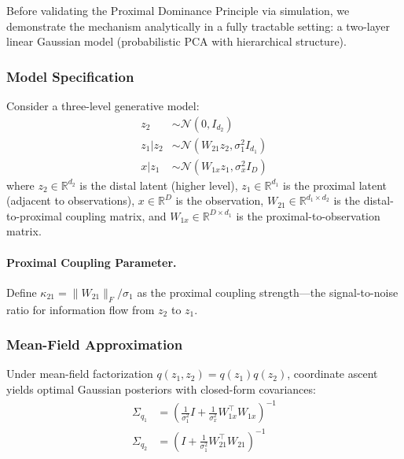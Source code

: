 \documentclass[10pt]{article} %
\theoremstyle{plain}
\theoremstyle{definition}
\begin{document}
Before validating the Proximal Dominance Principle via simulation, we demonstrate the mechanism analytically in a fully tractable setting: a two-layer linear Gaussian model (probabilistic PCA with hierarchical structure).

\subsubsection{Model Specification}

Consider a three-level generative model:
\begin{align}
z_2 &\sim \mathcal{N}(0, I_{d_2}) \\
z_1 | z_2 &\sim \mathcal{N}(W_{21} z_2, \sigma_1^2 I_{d_1}) \\
x | z_1 &\sim \mathcal{N}(W_{1x} z_1, \sigma_x^2 I_D)
\end{align}
where $z_2 \in \mathbb{R}^{d_2}$ is the distal latent (higher level), $z_1 \in \mathbb{R}^{d_1}$ is the proximal latent (adjacent to observations), $x \in \mathbb{R}^D$ is the observation, $W_{21} \in \mathbb{R}^{d_1 \times d_2}$ is the distal-to-proximal coupling matrix, and $W_{1x} \in \mathbb{R}^{D \times d_1}$ is the proximal-to-observation matrix.

\paragraph{Proximal Coupling Parameter.} Define $\kappa_{21} = \|W_{21}\|_F / \sigma_1$ as the proximal coupling strength---the signal-to-noise ratio for information flow from $z_2$ to $z_1$.

\subsubsection{Mean-Field Approximation}

Under mean-field factorization $q(z_1, z_2) = q(z_1) q(z_2)$, coordinate ascent yields optimal Gaussian posteriors with closed-form covariances:
\begin{align}
\Sigma_{q_1} &= \left(\frac{1}{\sigma_1^2}I + \frac{1}{\sigma_x^2}W_{1x}^\top W_{1x}\right)^{-1} \\
\Sigma_{q_2} &= \left(I + \frac{1}{\sigma_1^2}W_{21}^\top W_{21}\right)^{-1}
\end{align}
\end{document}
